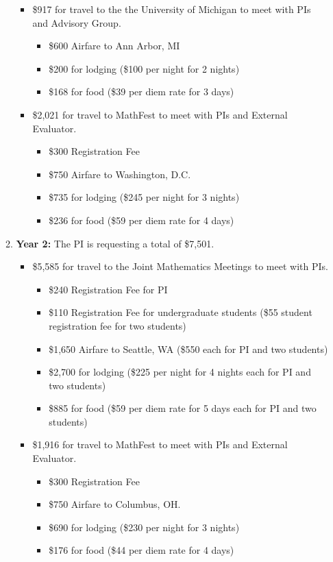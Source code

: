 \documentclass[11pt]{article}
\begin{document}
\begin{enumerate}[leftmargin=*]
\begin{enumerate}
\begin{itemize}
\item \$917 for travel to the the University of Michigan to meet with PIs and Advisory Group.
\begin{itemize}
\item \$600 Airfare to Ann Arbor, MI
\item \$200 for lodging (\$100 per night for 2 nights)
\item \$168 for food (\$39 per diem rate for 3 days)
\end{itemize}

\item \$2,021 for travel to MathFest to meet with PIs and External Evaluator.
\begin{itemize}
\item \$300 Registration Fee
\item \$750 Airfare to Washington, D.C.
\item \$735 for lodging (\$245 per night for 3 nights)
\item \$236 for food (\$59 per diem rate for 4 days)
\end{itemize}
\end{itemize}

\item[] \textbf{Year 2:} The PI is requesting a total of \$7,501.
\begin{itemize}
\item \$5,585 for travel to the Joint Mathematics Meetings to meet with PIs.
\begin{itemize}
\item \$240 Registration Fee for PI
\item \$110 Registration Fee for undergraduate students (\$55 student registration fee for two students)
\item \$1,650 Airfare to Seattle, WA (\$550 each for PI and two students)
\item \$2,700 for lodging (\$225 per night for 4 nights each for PI and two students)
\item \$885 for food (\$59 per diem rate for 5 days each for PI and two students)
\end{itemize}

\item \$1,916 for travel to MathFest to meet with PIs and External Evaluator.
\begin{itemize}
\item \$300 Registration Fee
\item \$750 Airfare to Columbus, OH.
\item \$690 for lodging (\$230 per night for 3 nights)
\item \$176 for food (\$44 per diem rate for 4 days)
\end{itemize}
\end{itemize}


\end{enumerate}
\end{enumerate}
\end{document}
